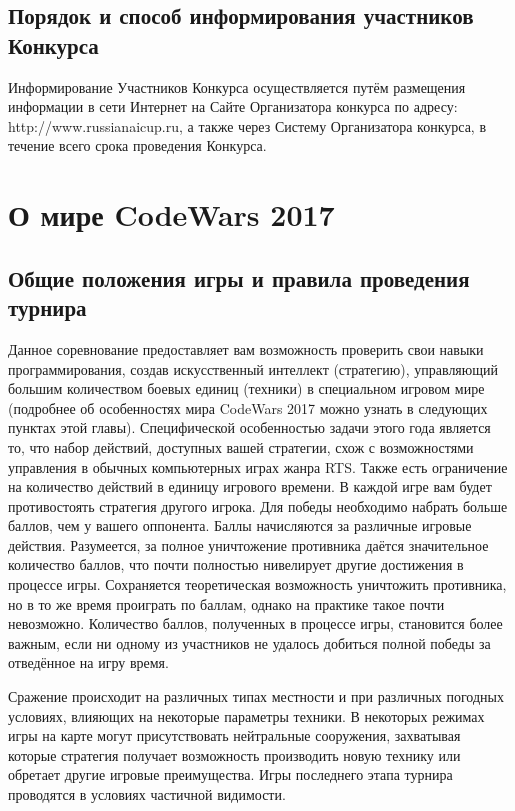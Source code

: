 \section{Порядок и способ информирования участников Конкурса}

Информирование Участников Конкурса осуществляется путём размещения информации в сети Интернет на Сайте Организатора конкурса по адресу:
http://www.russianaicup.ru, а также через Систему Организатора конкурса, в течение всего срока проведения Конкурса.

\chapter{О мире CodeWars 2017}

\section{Общие положения игры и правила проведения турнира}

Данное соревнование предоставляет вам возможность проверить свои навыки программирования, создав искусственный интеллект (стратегию),
управляющий большим количеством боевых единиц (техники) в специальном игровом мире (подробнее об особенностях мира CodeWars 2017 можно
узнать в следующих пунктах этой главы). Специфической особенностью задачи этого года является то, что набор действий, доступных вашей
стратегии, схож с возможностями управления в обычных компьютерных играх жанра RTS. Также есть ограничение на количество действий в единицу
игрового времени. В каждой игре вам будет противостоять стратегия другого игрока. Для победы необходимо набрать больше баллов, чем у вашего
оппонента. Баллы начисляются за различные игровые действия. Разумеется, за полное уничтожение противника даётся значительное количество
баллов, что почти полностью нивелирует другие достижения в процессе игры. Сохраняется теоретическая возможность уничтожить противника, но в
то же время проиграть по баллам, однако на практике такое почти невозможно. Количество баллов, полученных в процессе игры, становится более
важным, если ни одному из участников не удалось добиться полной победы за отведённое на игру время.

Сражение происходит на различных типах местности и при различных погодных условиях, влияющих на некоторые параметры техники. В некоторых
режимах игры на карте могут присутствовать нейтральные сооружения, захватывая которые стратегия получает возможность производить новую
технику или обретает другие игровые преимущества. Игры последнего этапа турнира проводятся в условиях частичной видимости.

